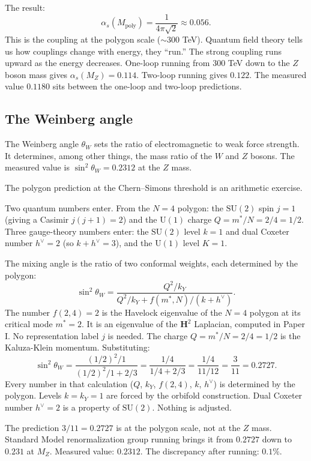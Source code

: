The result:
\[
  \alpha_s(M_{\text{poly}}) = \frac{1}{4\pi\sqrt{2}} \approx 0.056.
\]
This is the coupling at the polygon scale ($\sim 300$ TeV). Quantum
field theory tells us how couplings change with energy, they ``run.''
The strong coupling runs upward as the energy decreases. One-loop
running from $300$ TeV down to the $Z$ boson mass gives
$\alpha_s(M_Z) = 0.114$. Two-loop running gives $0.122$. The measured
value $0.1180$ sits between the one-loop and two-loop predictions.

\subsection*{The Weinberg angle}

The Weinberg angle $\theta_W$ sets the ratio of electromagnetic to
weak force strength. It determines, among other things, the mass ratio
of the $W$ and $Z$ bosons. The measured value is
$\sin^2\theta_W = 0.2312$ at the $Z$ mass.

The polygon prediction at the Chern--Simons threshold is an arithmetic
exercise.

Two quantum numbers enter. From the $N = 4$ polygon: the
$\mathrm{SU}(2)$ spin $j = 1$ (giving a Casimir $j(j+1) = 2$) and the
$\mathrm{U}(1)$ charge $Q = m^*/N = 2/4 = 1/2$. Three gauge-theory
numbers enter: the $\mathrm{SU}(2)$ level $k = 1$ and dual Coxeter
number $h^\vee = 2$ (so $k + h^\vee = 3$), and the $\mathrm{U}(1)$
level $K = 1$.

The mixing angle is the ratio of two conformal weights,
each determined by the polygon:
\[
  \sin^2\theta_W = \frac{Q^2/k_Y}{Q^2/k_Y + f(m^*,N)/(k + h^\vee)}.
\]
The number $f(2,4) = 2$ is the Havelock eigenvalue of the $N=4$
polygon at its critical mode $m^* = 2$. It is an eigenvalue of the
$\mathbf{H}^2$ Laplacian, computed in Paper I. No representation
label $j$ is needed. The charge $Q = m^*/N = 2/4 = 1/2$ is the
Kaluza-Klein momentum. Substituting:
\[
  \sin^2\theta_W = \frac{(1/2)^2 / 1}{(1/2)^2/1 + 2/3}
  = \frac{1/4}{1/4 + 2/3}
  = \frac{1/4}{11/12}
  = \frac{3}{11}
  = 0.2727.
\]
Every number in that calculation ($Q$, $k_Y$, $f(2,4)$, $k$, $h^\vee$) is
determined by the polygon. Levels $k = k_Y = 1$ are forced by the
orbifold construction. Dual Coxeter number $h^\vee = 2$ is a property of
$\mathrm{SU}(2)$. Nothing is adjusted.

The prediction $3/11 = 0.2727$ is at the polygon scale, not at the
$Z$ mass. Standard Model renormalization group running brings it from
$0.2727$ down to $0.231$ at $M_Z$. Measured value: $0.2312$. The
discrepancy after running: $0.1\%$.

